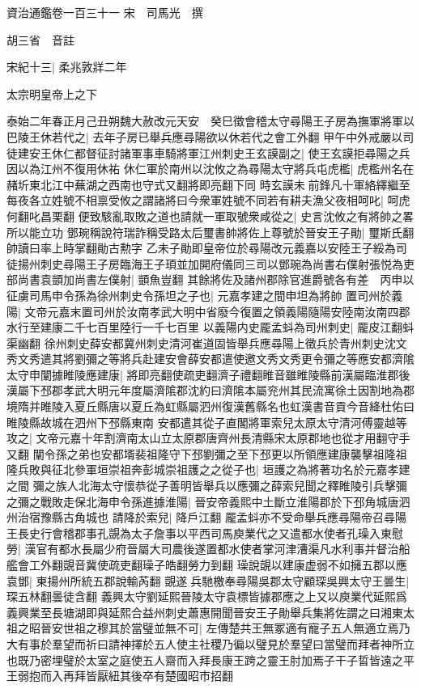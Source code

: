 資治通鑑卷一百三十一
宋　司馬光　撰

胡三省　音註

宋紀十三|{
	柔兆敦牂二年}


太宗明皇帝上之下

泰始二年春正月己丑朔魏大赦改元天安　癸巳徵會稽太守尋陽王子房為撫軍將軍以巴陵王休若代之|{
	去年子房已舉兵應尋陽欲以休若代之會工外翻}
甲午中外戒嚴以司徒建安王休仁都督征討諸軍事車騎將軍江州刺史王玄謨副之|{
	使王玄謨拒尋陽之兵因以為江州不復用休祐}
休仁軍於南州以沈攸之為尋陽太守將兵屯虎檻|{
	虎檻州名在赭圻東北江中蕪湖之西南也守式又翻將即亮翻下同}
時玄謨未前鋒凡十軍絡繹繼至每夜各立姓號不相禀受攸之謂諸將曰今衆軍姓號不同若有耕夫漁父夜相呵叱|{
	呵虎何翻叱昌栗翻}
便致駭亂取敗之道也請就一軍取號衆咸從之|{
	史言沈攸之有將帥之畧所以能立功}
鄧琬稱說符瑞詐稱受路太后璽書帥將佐上尊號於晉安王子勛|{
	璽斯氏翻帥讀曰率上時掌翻勛古勲字}
乙未子勛即皇帝位於尋陽改元義嘉以安陸王子綏為司徒揚州刺史尋陽王子房臨海王子頊並加開府儀同三司以鄧琬為尚書右僕射張悦為吏部尚書袁顗加尚書左僕射|{
	顗魚豈翻}
其餘將佐及諸州郡除官進爵號各有差　丙申以征虜司馬申令孫為徐州刺史令孫坦之子也|{
	元嘉孝建之間申坦為將帥}
置司州於義陽|{
	文帝元嘉末置司州於汝南孝武大明中省廢今復置之領義陽隨陽安陸南汝南四郡水行至建康二千七百里陸行一千七百里}
以義陽内史龎孟蚪為司州刺史|{
	龎皮江翻蚪渠幽翻}
徐州刺史薛安都冀州刺史清河崔道固皆舉兵應尋陽上徵兵於青州刺史沈文秀文秀遣其將劉彌之等將兵赴建安會薛安都遣使邀文秀文秀更令彌之等應安都濟隂太守申闡據睢陵應建康|{
	將即亮翻使疏吏翻濟子禮翻睢音雖睢陵縣前漢屬臨淮郡後漢屬下邳郡孝武大明元年度屬濟隂郡沈約曰濟隂本屬兖州其民流寓徐土因割地為郡境隋并睢陵入夏丘縣唐以夏丘為虹縣屬泗州復漢舊縣名也虹漢書音貢今音絳杜佑曰睢陵縣故城在泗州下邳縣東南}
安都遣其從子直閣將軍索兒太原太守清河傅靈越等攻之|{
	文帝元嘉十年割濟南太山立太原郡唐齊州長清縣宋太原郡地也從才用翻守手又翻}
闡令孫之弟也安都壻裴祖隆守下邳劉彌之至下邳更以所領應建康襲擊祖隆祖隆兵敗與征北參軍垣崇祖奔彭城崇祖護之之從子也|{
	垣護之為將著功名於元嘉孝建之間}
彌之族人北海太守懷恭從子善明皆舉兵以應彌之薛索兒聞之釋睢陵引兵擊彌之彌之戰敗走保北海申令孫進據淮陽|{
	晉安帝義熙中土斷立淮陽郡於下邳角城唐泗州治宿豫縣古角城也}
請降於索兒|{
	降戶江翻}
龎孟蚪亦不受命舉兵應尋陽帝召尋陽王長史行會稽郡事孔覬為太子詹事以平西司馬庾業代之又遣都水使者孔璪入東慰勞|{
	漢官有都水長屬少府晉屬大司農後遂置都水使者掌河津漕渠凡水利事并督治船艦會工外翻覬音冀使疏吏翻璪子皓翻勞力到翻}
璪說覬以建康虚弱不如擁五郡以應袁鄧|{
	東揚州所統五郡說輸芮翻}
覬遂兵馳檄奉尋陽吳郡太守顧琛吳興太守王曇生|{
	琛五林翻曇徒含翻}
義興太守劉延熙晉陵太守袁標皆據郡應之上又以庾業代延熙爲義興業至長塘湖即與延熙合益州刺史蕭惠開聞晉安王子勛舉兵集將佐謂之曰湘東太祖之昭晉安世祖之穆其於當璧並無不可|{
	左傳楚共王無冢適有寵子五人無適立焉乃大有事於羣望而祈曰請神擇於五人使主社稷乃徧以璧見於羣望曰當璧而拜者神所立也既乃密埋璧於太室之庭使五人齋而入拜長康王跨之靈王肘加焉子干子晢皆遠之平王弱抱而入再拜皆厭紐其後卒有楚國昭市招翻}
